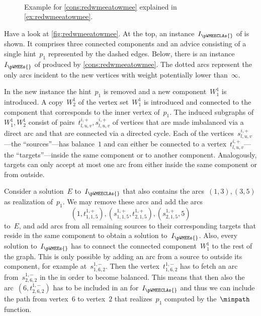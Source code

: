 \begin{figure}
  \begin{center}
     \\
    \caption{Example for \autoref{cons:redwmeeatowmee} explained in \autoref{ex:redwmeeatowmee}.}
    \label{fig:redwmeeatowmee}
  \end{center}
\end{figure}
\begin{example}\label{ex:redwmeeatowmee}
  Have a look at \autoref{fig:redwmeeatowmee}. At the top, an instance~$I_\pWMEECLAs{}$ of \pWMEECLAs{} is shown. It comprises three connected components and an advice consisting of a single hint~$p_1$ represented by the dashed edges. Below, there is an instance~$I_\pWMEEs{}$ of \pWMEEs{} produced by \autoref{cons:redwmeeatowmee}. The dotted arcs represent the only arcs incident to the new vertices with weight potentially lower than~$\infty$. 

In the new instance the hint~$p_1$ is removed and a new component~$W^1_1$ is introduced. A copy~$W^1_2$ of the vertex set~$W^1_1$ is introduced and connected to the component that corresponds to the inner vertex of~$p_1$. The induced subgraphs of~$W^1_1, W^1_2$ consist of pairs~$t^{i,+}_{l,u,v}, s^{i,+}_{l,u,v}$ of vertices that are made imbalanced via a direct arc and that are connected via a directed cycle. Each of the vertices~$s^{i,+}_{l,u,v}$---the ``sources''---has balance~$1$ and can either be connected to a vertex~$t^{i,+}_{l,u,v}$---the ``targets''---inside the same component or to another component. Analogously, targets can only accept at most one arc from either inside the same component or from outside. 

Consider a solution~$E$ to~$I_\pWMEECLAs{}$ that also contains the arcs~$(1, 3), (3,5)$ as realization of~$p_1$. We may remove these arcs and add the arcs~\[(1, t^{1, +}_{1,1,5}), (s^{1,+}_{1, 1, 5}, t^{1, +}_{2, 1, 5}), (s^{1, +}_{2, 1, 5}, 5)\] to~$E$, and add arcs from all remaining sources to their corresponding targets that reside in the same component to obtain a solution to~$I_\pWMEEs{}$. Also, every solution to~$I_\pWMEEs{}$ has to connect the connected component~$W^1_1$ to the rest of the graph. This is only possible by adding an arc from a source to outside its component, for example at~$s^{1,-}_{1, 6, 2}$. Then the vertex~$t^{1, -}_{1, 6, 2}$ has to fetch an arc from~$s^{1, -}_{2, 6, 2}$ in the \EE{} in order to become balanced. This means that then also the arc~$(6,t^{1, -}_{2, 6, 2})$ has to be included in an \EE{} for~$I_\pWMEECLAs{}$ and thus we can include the path from vertex~$6$ to vertex~$2$ that realizes~$p_1$ computed by the~$\minpath$ function.
\end{example}
